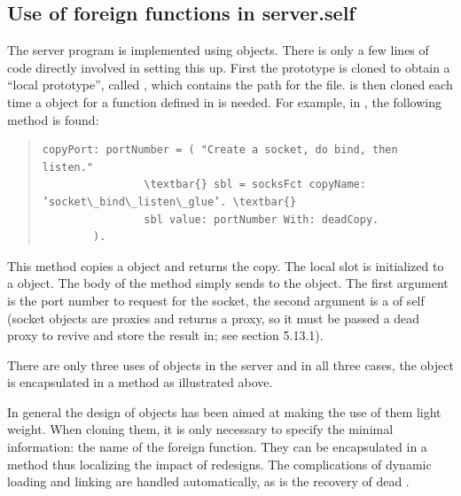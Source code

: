 \documentclass[letterpaper,10pt,english]{sphinxmanual}
\begin{document}
\subsection{Use of foreign functions in server.self}
\label{vmref:use-of-foreign-functions-in-server-self}
The server program is implemented using  objects. There is only a few lines of code
directly involved in setting this up. First the  prototype is cloned to obtain a “local
prototype”, called , which contains the path for the  file.  is then
cloned each time a  object for a function defined in  is needed. For example,
in , the following method is found:
\begin{quote}

\begin{Verbatim}[commandchars=\\\{\}]
copyPort: portNumber = ( "Create a socket, do bind, then listen."
                \textbar{} sbl = socksFct copyName: ’socket\_bind\_listen\_glue’. \textbar{}
                sbl value: portNumber With: deadCopy.
        ).
\end{Verbatim}
\end{quote}

This method copies a  object and returns the copy. The local slot  is initialized to a
 object. The body of the method simply sends  to the 
object. The first argument is the port number to request for the socket, the second argument is a
 of self (socket objects are proxies and  returns a proxy, so it
must be passed a dead proxy to revive and store the result in; see section 5.13.1).

There are only three uses of  objects in the server and in all three cases, the 
object is encapsulated in a method as illustrated above.

In general the design of  objects has been aimed at making the use of them light
weight. When cloning them, it is only necessary to specify the minimal information: the name of
the foreign function. They can be encapsulated in a method thus localizing the impact of redesigns.
The complications of dynamic loading and linking are handled automatically, as is the recovery of
dead .

\end{document}
